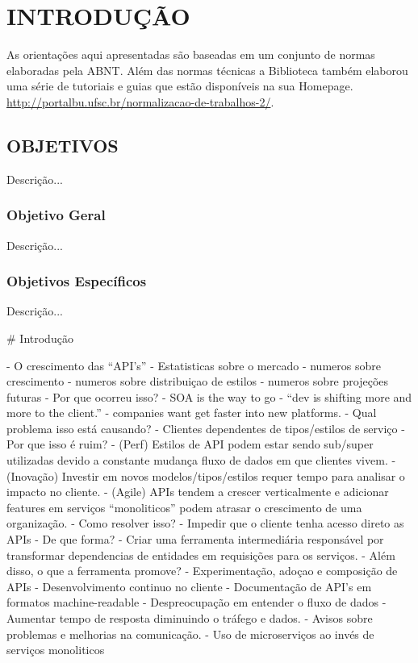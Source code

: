 
\chapter{INTRODUÇÃO}

As orientações aqui apresentadas
são baseadas em um conjunto de normas
elaboradas pela ABNT.
Além das normas técnicas a
Biblioteca também elaborou uma série de tutoriais
e guias que estão disponíveis na sua Homepage.
\url{http://portalbu.ufsc.br/normalizacao-de-trabalhos-2/}.

\section{OBJETIVOS}

Descrição...

\subsection{Objetivo Geral}

Descrição...

\subsection{Objetivos Específicos}

Descrição...

# Introdução

- O crescimento das “API’s”
	- Estatisticas sobre o mercado
		- numeros sobre crescimento
		- numeros sobre distribuiçao de estilos
		- numeros sobre projeções futuras
	- Por que ocorreu isso?
		- SOA is the way to go
		- “dev is shifting more and more to the client.”
		- companies want get faster into new platforms.
	- Qual problema isso está causando?
		- Clientes dependentes de tipos/estilos de serviço
	- Por que isso é ruim?
		- (Perf) Estilos de API podem estar sendo sub/super utilizadas devido a constante mudança fluxo de dados em que clientes vivem.
		- (Inovação) Investir em novos modelos/tipos/estilos requer tempo para analisar o impacto no cliente.
		- (Agile) APIs tendem a crescer verticalmente e adicionar features em serviços “monoliticos” podem atrasar o crescimento de uma organização.
	- Como resolver isso?
		- Impedir que o cliente tenha acesso direto as APIs
	- De que forma?
		- Criar uma ferramenta intermediária responsável por transformar dependencias de entidades em requisições para os serviços.
	- Além disso, o que a ferramenta promove?
		- Experimentação, adoçao e composição de APIs
		- Desenvolvimento continuo no cliente
		- Documentação de API’s em formatos machine-readable
		- Despreocupação em entender o fluxo de dados
		- Aumentar tempo de resposta diminuindo o tráfego e dados.
		- Avisos sobre problemas e melhorias na comunicação.
		- Uso de microserviços ao invés de serviços monoliticos

